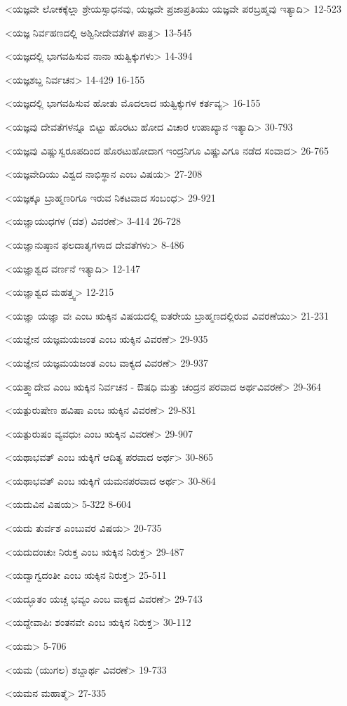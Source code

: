 <ಯಜ್ಞವೇ ಲೋಕಕ್ಕೆಲ್ಲಾ ಶ್ರೇಯಸ್ಸಾಧನವು, ಯಜ್ಞವೇ ಪ್ರಜಾಪ್ರತಿಯು ಯಜ್ಞವೇ ಪರಬ್ರಹ್ಮವು ಇತ್ಯಾದಿ>
12-523

<ಯಜ್ಞ ನಿರ್ವಹಣದಲ್ಲಿ ಅಶ್ವಿನೀದೇವತೆಗಳ ಪಾತ್ರ>
13-545

<ಯಜ್ಞದಲ್ಲಿ ಭಾಗವಹಿಸುವ ನಾನಾ ಋತ್ವಿಕ್ಕುಗಳು>
14-394

<ಯಜ್ಞಶಬ್ದ ನಿರ್ವಚನ>
14-429
16-155

<ಯಜ್ಞದಲ್ಲಿ ಭಾಗವಹಿಸುವ ಹೋತು ಮೊದಲಾದ ಋತ್ವಿಕ್ಕುಗಳ ಕರ್ತವ್ಯ>
16-155

<ಯಜ್ಞವು ದೇವತೆಗಳನ್ನೂ ಬಿಟ್ಟು ಹೊರಟು ಹೋದ ವಿಚಾರ ಉಪಾಖ್ಯಾನ ಇತ್ಯಾದಿ>
30-793

<ಯಜ್ಞವು ವಿಷ್ಣುಸ್ವರೂಪದಿಂದ ಹೊರಟುಹೋದಾಗ ಇಂದ್ರನಿಗೂ ವಿಷ್ಣುವಿಗೂ ನಡೆದ ಸಂವಾದ>
26-765

<ಯಜ್ಞವೇದಿಯು ವಿಶ್ವದ ನಾಭಿಸ್ಥಾನ ಎಂಬ ವಿಷಯ>
27-208

<ಯಜ್ಞಕ್ಕೂ ಬ್ರಾಹ್ಮಣರಿಗೂ ಇರುವ ನಿಕಟವಾದ ಸಂಬಂಧ>
29-921

<ಯಜ್ಞಾಯುಧಗಳ (ದಶ) ವಿವರಣೆ>
3-414
26-728

<ಯಜ್ಞಾನುಷ್ಠಾನ ಫಲದಾತೃಗಳಾದ ದೇವತೆಗಳು>
8-486

<ಯಜ್ಞಾಶ್ವದ ವರ್ಣನೆ ಇತ್ಯಾದಿ>
12-147

<ಯಜ್ಞಾಶ್ವದ ಮಹತ್ತ್ವ>
12-215

<ಯಜ್ಞಾ ಯಜ್ಞಾ ವಃ ಎಂಬ ಋಕ್ಕಿನ ವಿಷಯದಲ್ಲಿ ಐತರೇಯ ಬ್ರಾಹ್ಮಣದಲ್ಲಿರುವ ವಿವರಣೆಯು>
21-231

<ಯಜ್ಞೇನ ಯಜ್ಞಮಯಜಂತ ಎಂಬ ಋಕ್ಕಿನ ವಿವರಣೆ>
29-935

<ಯಜ್ಞೇನ ಯಜ್ಞಮಯಜಂತ ಎಂಬ ವಾಕ್ಯದ ವಿವರಣೆ>
29-937

<ಯತ್ತ್ವಾದೇವ ಎಂಬ ಋಕ್ಕಿನ ನಿರ್ವಚನ - ಔಷಧಿ ಮತ್ತು ಚಂದ್ರನ ಪರವಾದ ಅರ್ಥವಿವರಣೆ>
29-364

<ಯತ್ಪುರುಷೇಣ ಹವಿಷಾ ಎಂಬ ಋಕ್ಕಿನ ವಿವರಣೆ>
29-831

<ಯತ್ಪುರುಷಂ ವ್ಯವಧುಃ ಎಂಬ ಋಕ್ಕಿನ ವಿವರಣೆ>
29-907

<ಯಥಾಭವತ್‍ ಎಂಬ ಋಕ್ಕಿಗೆ ಆದಿತ್ಯ ಪರವಾದ ಅರ್ಥ>
30-865

<ಯಥಾಭವತ್‍ ಎಂಬ ಋಕ್ಕಿಗೆ ಯಮನಪರವಾದ ಅರ್ಥ>
30-864

<ಯದುವಿನ ವಿಷಯ>
5-322
8-604

<ಯದು ತುರ್ವಶ ಎಂಬುವರ ವಿಷಯ>
20-735

<ಯದುದಂಚುಃ ನಿರುಕ್ತ ಎಂಬ ಋಕ್ಕಿನ ನಿರುಕ್ತ>
29-487

<ಯದ್ವಾಗ್ವದಂತೀ ಎಂಬ ಋಕ್ಕಿನ ನಿರುಕ್ತ>
25-511

<ಯದ್ಭೂತಂ ಯಚ್ಚ ಭವ್ಯಂ ಎಂಬ ವಾಕ್ಯದ ವಿವರಣೆ>
29-743

<ಯದ್ದೇವಾಪಿಃ ಶಂತನವೇ ಎಂಬ ಋಕ್ಕಿನ ನಿರುಕ್ತ>
30-112

<ಯಮ>
5-706

<ಯಮ (ಯುಗಲ) ಶಬ್ದಾರ್ಥ ವಿವರಣೆ>
19-733

<ಯಮನ ಮಹಾತ್ಮೆ>
27-335

